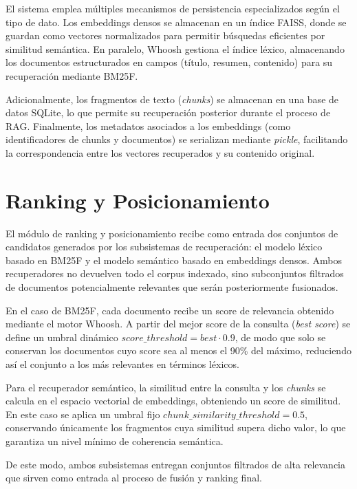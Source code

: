 \documentclass[runningheads]{llncs}
\begin{document}
El sistema emplea múltiples mecanismos de persistencia especializados según el tipo de dato. 
Los embeddings densos se almacenan en un índice FAISS, donde se guardan como vectores normalizados 
para permitir búsquedas eficientes por similitud semántica. 
En paralelo, Whoosh gestiona el índice léxico, almacenando los documentos estructurados en campos 
(título, resumen, contenido) para su recuperación mediante BM25F.

Adicionalmente, los fragmentos de texto (\textit{chunks}) se almacenan en una base de datos SQLite, 
lo que permite su recuperación posterior durante el proceso de RAG. 
Finalmente, los metadatos asociados a los embeddings (como identificadores de chunks y documentos) 
se serializan mediante \textit{pickle}, facilitando la correspondencia entre los vectores recuperados y su contenido original.

\section{Ranking y Posicionamiento}

El módulo de ranking y posicionamiento recibe como entrada dos conjuntos de candidatos generados por los subsistemas de recuperación: 
el modelo léxico basado en BM25F y el modelo semántico basado en embeddings densos. 
Ambos recuperadores no devuelven todo el corpus indexado, sino subconjuntos filtrados de documentos potencialmente relevantes que serán posteriormente fusionados.

En el caso de BM25F, cada documento recibe un score de relevancia obtenido mediante el motor Whoosh. 
A partir del mejor score de la consulta (\textit{best score}) se define un umbral dinámico $score\_threshold = best \cdot 0.9$, 
de modo que solo se conservan los documentos cuyo score sea al menos el 90\% del máximo, reduciendo así el conjunto a los más relevantes en términos léxicos.

Para el recuperador semántico, la similitud entre la consulta y los \textit{chunks} se calcula en el espacio vectorial de embeddings, 
obteniendo un score de similitud. 
En este caso se aplica un umbral fijo $chunk\_similarity\_threshold = 0.5$, conservando únicamente los fragmentos cuya similitud supera dicho valor, 
lo que garantiza un nivel mínimo de coherencia semántica.

De este modo, ambos subsistemas entregan conjuntos filtrados de alta relevancia que sirven como entrada al proceso de fusión y ranking final.
\end{document}
